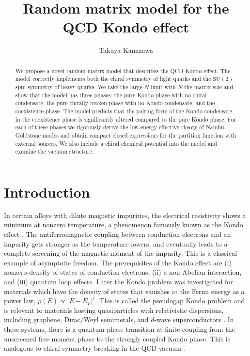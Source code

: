 \documentclass[aps,prd,longbibliography,reprint]{revtex4-2}
\newcommand{\SU}{\text{SU}}
\newcommand{\1}{\mathbbm{1}}
\begin{document}
\title{Random matrix model for the QCD Kondo effect}

\author{Takuya Kanazawa}
\allowdisplaybreaks


\begin{abstract}
We propose a novel random matrix model that describes the QCD Kondo effect. The model correctly implements both the chiral symmetry of light quarks and the $\SU(2)$ spin symmetry of heavy quarks. We take the large-$N$ limit with $N$ the matrix size and show that the model has three phases: the pure Kondo phase with no chiral condensate, the pure chirally broken phase with no Kondo condensate, and the coexistence phase. The model predicts that the pairing form of the Kondo condensate in the coexistence phase is significantly altered compared to the pure Kondo phase. For each of these phases we rigorously derive the low-energy effective theory of Nambu-Goldstone modes and obtain compact closed expressions for the partition function with external sources. We also include a chiral chemical potential into the model and examine the vacuum structure.  
\end{abstract}
\maketitle


\section{Introduction}

In certain alloys with dilute magnetic impurities, the electrical resistivity shows a minimum at nonzero temperature, a phenomenon famously known as the Kondo effect \cite{Kondo:1964nea,hewson_1993,Coleman2006,Hewson:2009}. The antiferromagnetic coupling between conduction electrons and an impurity gets stronger as the temperature lowers, and eventually leads to a complete screening of the magnetic moment of the impurity. This is a classical example of asymptotic freedom. The prerequisites of the Kondo effect are (i) nonzero density of states of conduction electrons, (ii) a non-Abelian interaction, and (iii) quantum loop effects. Later the Kondo problem was investigated for materials which have the density of states that vanishes at the Fermi energy as a power law, $\rho(E)\propto|E-E_F|^r$. This is called the pseudogap Kondo problem and is relevant to materials hosting quasiparticles with relativistic dispersions, including graphene, Dirac/Weyl semimetals, and $d$-wave superconductors \cite{PhysRevLett.64.1835,PhysRevB.53.15079,PhysRevB.57.14254,PhysRevB.70.214427,PhysRevB.74.144410,ChenNature2011,Fritz_2013,PhysRevB.92.041107,PhysRevB.92.121109,PhysRevB.92.195124,doi:10.7566/JPSJ.84.074705,PhysRevB.98.075110}. In these systems, there is a quantum phase transition at finite coupling from the unscreened free moment phase to the strongly coupled Kondo phase. This is analogous to chiral symmetry breaking in the QCD vacuum \cite{Nambu:1961tp,Nambu:1961fr}.  
\end{document}
